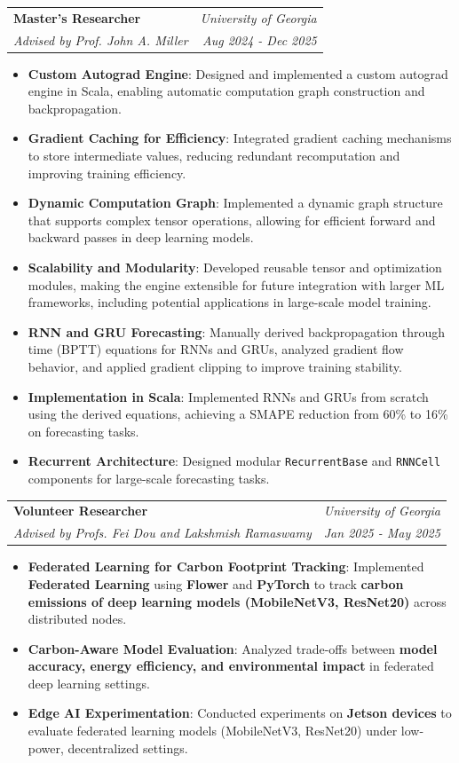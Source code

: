 \documentclass[a4paper,10pt]{article}
\makeatletter
\newcommand{\resumeSubheading}[4]{
  \Needspace{10\baselineskip}
  \item
    \begin{tabular*}{0.97\textwidth}{l@{\extracolsep{\fill}}r}
      \textbf{#1} & \textit{#2} \\
      \textit{\small#3} & \textit{\small#4} \\
    \end{tabular*}
}
\newcommand{\resumeItem}[2]{\item \small{\textbf{#1}{: #2 \vspace{-2pt}}}}
\newcommand{\resumeItemListStart}{\begin{itemize}}
\newcommand{\resumeItemListEnd}{\end{itemize}}
\makeatother
\begin{document}
    \resumeSubheading
        {Master's Researcher}{University of Georgia}
        {Advised by Prof. John A. Miller}{Aug 2024 - Dec 2025}
        \resumeItemListStart
            \resumeItem{Custom Autograd Engine}
                {Designed and implemented a custom autograd engine in Scala, enabling automatic computation graph construction and backpropagation.}
            \resumeItem{Gradient Caching for Efficiency}
                {Integrated gradient caching mechanisms to store intermediate values, reducing redundant recomputation and improving training efficiency.}
            \resumeItem{Dynamic Computation Graph}
                {Implemented a dynamic graph structure that supports complex tensor operations, allowing for efficient forward and backward passes in deep learning models.}
            \resumeItem{Scalability and Modularity}
                {Developed reusable tensor and optimization modules, making the engine extensible for future integration with larger ML frameworks, including potential applications in large-scale model training.}
            \resumeItem{RNN and GRU Forecasting}
                {Manually derived backpropagation through time (BPTT) equations for RNNs and GRUs, analyzed gradient flow behavior, and applied gradient clipping to improve training stability.}
            \resumeItem{Implementation in Scala}
                {Implemented RNNs and GRUs from scratch using the derived equations, achieving a SMAPE reduction from 60\% to 16\% on forecasting tasks.}
            \resumeItem{Recurrent Architecture}
                {Designed modular \texttt{RecurrentBase} and \texttt{RNNCell} components for large-scale forecasting tasks.}
        \resumeItemListEnd

    \resumeSubheading
        {Volunteer Researcher}{University of Georgia}
        {Advised by Profs. Fei Dou and Lakshmish Ramaswamy}{Jan 2025 - May 2025}
        \resumeItemListStart
            \resumeItem{Federated Learning for Carbon Footprint Tracking}
                {Implemented \textbf{Federated Learning} using \textbf{Flower} and \textbf{PyTorch} to track \textbf{carbon emissions of deep learning models (MobileNetV3, ResNet20)} across distributed nodes.}
            \resumeItem{Carbon-Aware Model Evaluation}
                {Analyzed trade-offs between \textbf{model accuracy, energy efficiency, and environmental impact} in federated deep learning settings.}
            \resumeItem{Edge AI Experimentation}
                {Conducted experiments on \textbf{Jetson devices} to evaluate federated learning models (MobileNetV3, ResNet20) under low-power, decentralized settings.}
        \resumeItemListEnd
\end{document}
